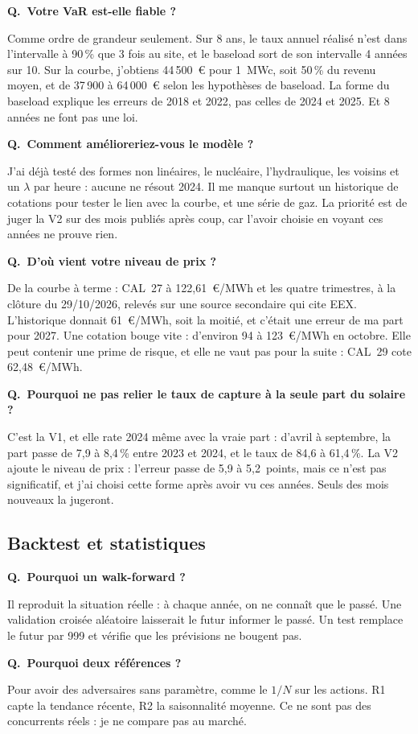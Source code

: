 \documentclass[11pt,a4paper]{article}
\newcounter{qr}
\newcommand{\qr}[2]{\stepcounter{qr}\par\medskip\noindent\textbf{Q\theqr.\ #1}\par\nopagebreak\noindent #2\par}
\begin{document}
\qr{Votre VaR est-elle fiable ?}{Comme ordre de grandeur seulement. Sur 8 ans, le taux annuel réalisé n'est dans l'intervalle à 90\,\% que 3 fois au site, et le baseload sort de son intervalle 4 années sur 10. Sur la courbe, j'obtiens 44\,500~€ pour 1~MWc, soit 50\,\% du revenu moyen, et de 37\,900 à 64\,000~€ selon les hypothèses de baseload. La forme du baseload explique les erreurs de 2018 et 2022, pas celles de 2024 et 2025. Et 8 années ne font pas une loi.}

\qr{Comment amélioreriez-vous le modèle ?}{J'ai déjà testé des formes non linéaires, le nucléaire, l'hydraulique, les voisins et un $\lambda$ par heure : aucune ne résout 2024. Il me manque surtout un historique de cotations pour tester le lien avec la courbe, et une série de gaz. La priorité est de juger la V2 sur des mois publiés après coup, car l'avoir choisie en voyant ces années ne prouve rien.}

\qr{D'où vient votre niveau de prix ?}{De la courbe à terme : CAL~27 à 122,61~€/MWh et les quatre trimestres, à la clôture du 29/10/2026, relevés sur une source secondaire qui cite EEX. L'historique donnait 61~€/MWh, soit la moitié, et c'était une erreur de ma part pour 2027. Une cotation bouge vite : d'environ 94 à 123~€/MWh en octobre. Elle peut contenir une prime de risque, et elle ne vaut pas pour la suite : CAL~29 cote 62,48~€/MWh.}

\qr{Pourquoi ne pas relier le taux de capture à la seule part du solaire ?}{C'est la V1, et elle rate 2024 même avec la vraie part : d'avril à septembre, la part passe de 7,9 à 8,4\,\% entre 2023 et 2024, et le taux de 84,6 à 61,4\,\%. La V2 ajoute le niveau de prix : l'erreur passe de 5,9 à 5,2~points, mais ce n'est pas significatif, et j'ai choisi cette forme après avoir vu ces années. Seuls des mois nouveaux la jugeront.}

\subsection{Backtest et statistiques}

\qr{Pourquoi un walk-forward ?}{Il reproduit la situation réelle : à chaque année, on ne connaît que le passé. Une validation croisée aléatoire laisserait le futur informer le passé. Un test remplace le futur par 999 et vérifie que les prévisions ne bougent pas.}

\qr{Pourquoi deux références ?}{Pour avoir des adversaires sans paramètre, comme le $1/N$ sur les actions. R1 capte la tendance récente, R2 la saisonnalité moyenne. Ce ne sont pas des concurrents réels : je ne compare pas au marché.}
\end{document}
